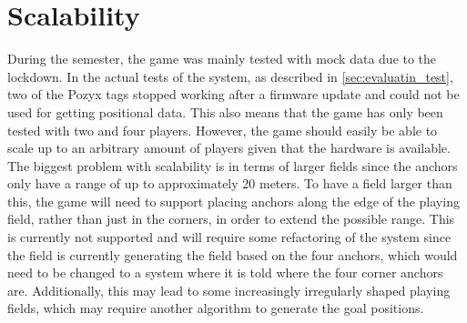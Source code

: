 \section{Scalability}
During the semester, the game was mainly tested with mock data due to the lockdown.
In the actual tests of the system, as described in \autoref{sec:evaluatin_test}, two of the Pozyx tags stopped working after a firmware update and could not be used for getting positional data.
This also means that the game has only been tested with two and four players.
However, the game should easily be able to scale up to an arbitrary amount of players given that the hardware is available.
The biggest problem with scalability is in terms of larger fields since the anchors only have a range of up to approximately 20 meters.
To have a field larger than this, the game will need to support placing anchors along the edge of the playing field, rather than just in the corners, in order to extend the possible range.
This is currently not supported and will require some refactoring of the system since the field is currently generating the field based on the four anchors, which would need to be changed to a system where it is told where the four corner anchors are.
Additionally, this may lead to some increasingly irregularly shaped playing fields, which may require another algorithm to generate the goal positions.
